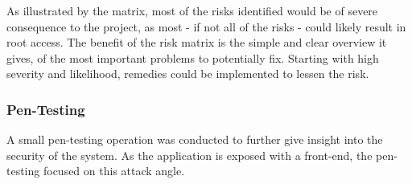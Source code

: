 \begin{table}[!h]
\centering
\caption{Risk Matrix}
\end{table}

As illustrated by the matrix, most of the risks identified would be of severe consequence to the project, as most - if not all of the risks - could likely result in root access. The benefit of the risk matrix is the simple and clear overview it gives, of the most important problems to potentially fix. Starting with high severity and likelihood, remedies could be implemented to lessen the risk. 

\subsubsection{Pen-Testing}
A small pen-testing operation was conducted to further give insight into the security of the system. As the application is exposed with a front-end, the pen-testing focused on this attack angle. 

